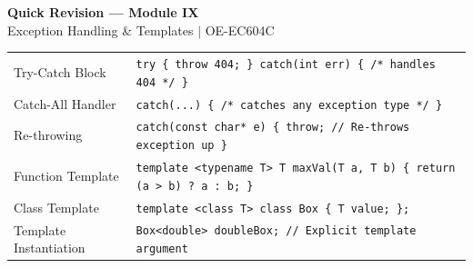 \documentclass[12pt,a4paper]{article}
\renewcommand{\arraystretch}{1.45}
\begin{document}
\newpage
\begin{center}
  {\large\bfseries\color{myred} Quick Revision --- Module IX}\\[3pt]
  {\small\color{mydark} Exception Handling \& Templates $|$ OE-EC604C}
\end{center}
\noindent{\color{myred}\rule{\linewidth}{1.2pt}}
\vspace{4pt}

\begin{tcolorbox}[formulabox, title={\textbf{Key Exception and Template Syntax}}]
\renewcommand{\arraystretch}{1.3}
\begin{tabularx}{\linewidth}{B{3.8cm} X}
Try-Catch Block          & \texttt{try \{ throw 404; \} catch(int err) \{ /* handles 404 */ \}} \\[4pt]
Catch-All Handler        & \texttt{catch(...) \{ /* catches any exception type */ \}} \\[4pt]
Re-throwing              & \texttt{catch(const char* e) \{ throw; // Re-throws exception up \} } \\[4pt]
Function Template        & \texttt{template <typename T> T maxVal(T a, T b) \{ return (a > b) ? a : b; \}} \\[4pt]
Class Template           & \texttt{template <class T> class Box \{ T value; \};} \\[4pt]
Template Instantiation   & \texttt{Box<double> doubleBox; // Explicit template argument}
\end{tabularx}
\end{tcolorbox}
\end{document}
